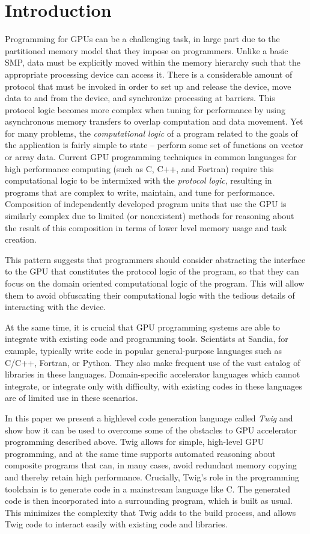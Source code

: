 
\section{Introduction}

Programming for GPUs can be a challenging task, in large part due to the
partitioned memory model that they impose on programmers. Unlike a basic SMP,
data must be explicitly moved within the memory hierarchy such that the
appropriate processing device can access it. There is a considerable amount of
protocol that must be invoked in order to set up and release the device, move
data to and from the device, and synchronize processing at barriers. This
protocol logic becomes more complex when tuning for performance by using
asynchronous memory transfers to overlap computation and data movement. Yet for
many problems, the \emph{computational logic} of a program related to the goals
of the application is fairly simple to state -- perform some set of functions on
vector or array data. Current GPU programming techniques in common languages for
high performance computing (such as C, C++, and Fortran) require this
computational logic to be intermixed with the \emph{protocol logic}, resulting
in programs that are complex to write, maintain, and tune for performance.
Composition of independently developed program units that use the GPU is
similarly complex due to limited (or nonexistent) methods for reasoning about
the result of this composition in terms of lower level memory usage and task
creation.

This pattern suggests that programmers should consider abstracting the interface
to the GPU that constitutes the protocol logic of the program, so that they can
focus on the domain oriented computational logic of the program. This will allow
them to avoid obfuscating their computational logic with the tedious details of
interacting with the device.

At the same time, it is crucial that GPU programming systems are able to
integrate with existing code and programming tools. Scientists at Sandia, for
example, typically write code in popular general-purpose languages such as
C/C++, Fortran, or Python. They also make frequent use of the vast catalog of
libraries in these languages. Domain-specific accelerator languages which cannot
integrate, or integrate only with difficulty, with existing codes in these
languages are of limited use in these scenarios.

In this paper we present a high\-level code generation language called
\emph{Twig} and show how it can be used to overcome some of the obstacles to GPU
accelerator programming described above. Twig allows for simple, high-level GPU
programming, and at the same time supports automated reasoning about composite
programs that can, in many cases, avoid redundant memory copying and thereby
retain high performance. Crucially, Twig's role in the programming toolchain is
to generate code in a mainstream language like C. The generated code is then
incorporated into a surrounding program, which is built as usual. This minimizes
the complexity that Twig adds to the build process, and allows Twig code to
interact easily with existing code and libraries.

